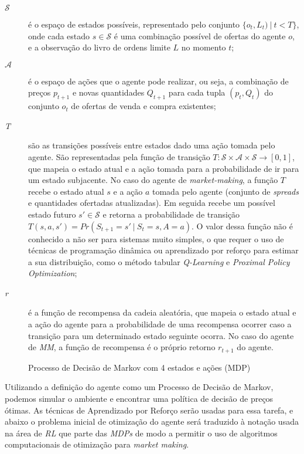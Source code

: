 \begin{description}
	\item[$\mathcal{S}$] 
	é o espaço de estados possíveis, representado pelo conjunto $\{o_{t}, L_{t}) \ | \ t < T\}$, onde cada estado $s \in \mathcal{S}$ é uma combinação possível de ofertas do agente $o$, e a observação do livro de ordens limite $L$ no momento $t$;
	
	\item[$\mathcal{A}$] é o espaço de ações que o agente pode realizar, ou seja, a combinação de preços $p_{t + 1}$ e novas quantidades $Q_{t+1}$ para cada tupla $(p_{t}, Q_{t})$ do conjunto $o_{t}$ de ofertas de venda e compra existentes;
	
	\item[\textit{T}] são as transições possíveis entre estados dado uma ação tomada pelo agente. São representadas pela função de transição $T :  \mathcal{S} \times \mathcal{A} \times \mathcal{S} \rightarrow [0, 1]$, que mapeia o estado atual e a ação tomada para a probabilidade de ir para um estado subjacente. No caso do agente de \textit{market-making}, a função $T$ recebe o estado atual $s$ e a ação $a$ tomada pelo agente (conjunto de \textit{spreads} e quantidades ofertadas atualizadas). Em seguida recebe um possível estado futuro $s' \in \mathcal{S}$ e retorna a probabilidade de transição $T(s, a, s') = Pr(S_{t+1} = s' \ | \ S_{t} = s, A = a)$. O valor dessa função não é conhecido a não ser para sistemas muito simples, o que requer o uso de técnicas de programação dinâmica ou aprendizado por reforço para estimar a sua distribuição, como o método tabular \textit{Q-Learning} e \textit{Proximal Policy Optimization};
	
	\item[\textit{r}] é a função de recompensa da cadeia aleatória, que mapeia o estado atual e a ação do agente para a probabilidade de uma recompensa ocorrer caso a transição para um determinado estado seguinte ocorra. No caso do agente de \textit{MM}, a função de recompensa é o próprio retorno $r_{t+1}$ do agente.
\end{description}

\begin{figure}[H]
	\centering
	
	\caption{Processo de Decisão de Markov com 4 estados e ações (MDP)}
	\label{fig:mdp}
\end{figure}

Utilizando a definição do agente como um Processo de Decisão de Markov, podemos simular o ambiente e encontrar uma política de decisão de preços ótimas. As técnicas de Aprendizado por Reforço serão usadas para essa tarefa, e abaixo o problema inicial de otimização do agente será traduzido à notação usada na área de \textit{RL} que parte das \textit{MDPs} de modo a permitir o uso de algoritmos computacionais de otimização para \textit{market making}.


